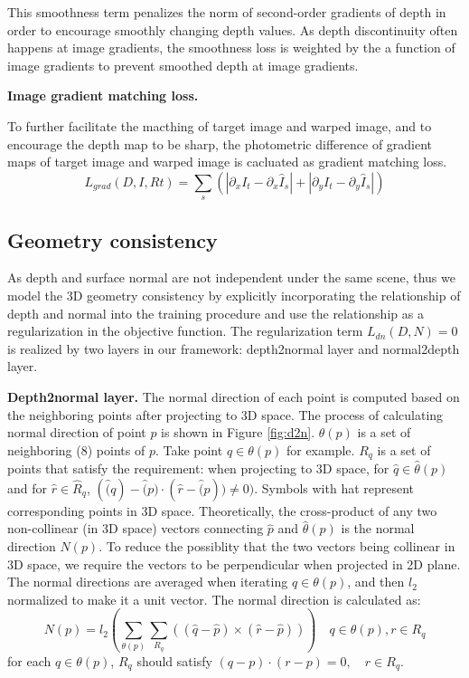 \documentclass[letterpaper]{article} %
\begin{document}
This smoothness term penalizes the norm of second-order gradients of depth in order to encourage smoothly changing depth values. As depth discontinuity often happens at image gradients, the smoothness loss is weighted by the a function of image gradients to prevent smoothed depth at image gradients. 

\textbf{Image gradient matching loss.}

To further facilitate the macthing of target image and warped image, and to encourage the depth map to be sharp, the photometric difference of gradient maps of target image and warped image is cacluated as gradient matching loss.
$$L_{grad}(D, I, Rt) = \sum_s(|\partial_xI_t - \partial_x\hat{I}_s| + |\partial_yI_t - \partial_y\hat{I}_s|)$$


\subsection{Geometry consistency}

As depth and surface normal are not independent under the same scene, 
thus we model the 3D geometry consistency by explicitly incorporating the relationship of depth and normal into the training procedure and use the relationship as a regularization in the objective function. The regularization term $L_{dn}(D,N) = 0$ is realized by two layers in our framework: depth2normal layer and normal2depth layer.

\textbf{Depth2normal layer.} The normal direction of each point is computed based on the neighboring points after projecting to 3D space. The process of calculating normal direction of point $p$ is shown in Figure \ref{fig:d2n}. $\theta(p)$ is a set of neighboring (8) points of $p$. Take point $q \in \theta(p)$ for example. $R_{q}$ is a set of points that satisfy the requirement: when projecting to 3D space, for $\hat{q} \in \hat{\theta}(p)$ and for $\hat{r} \in \hat{R}_{q}$, $(\hat(q)-\hat(p) \cdot (\hat{r} - \hat(p)) \neq 0)$. Symbols with hat represent corresponding points in 3D space. Theoretically, the cross-product of any two non-collinear (in 3D space) vectors connecting $\hat{p}$ and $\hat{\theta}(p)$ is the normal direction $N(p)$. To reduce the possiblity that the two vectors being collinear in 3D space, we require the vectors to be perpendicular when projected in 2D plane. The normal directions are averaged when iterating $q \in \theta(p)$, and then $l_2$ normalized to make it a unit vector. The normal direction is calculated as:
$$N(p) = l_2(\sum_{\theta(p)}\sum_{R_q}((\hat{q} - \hat{p}) \times (\hat{r} - \hat{p}))) \quad q \in \theta(p), r \in R_q$$
for each $q\in\theta(p)$, $R_q$ should satisfy $(q-p)\cdot(r-p) = 0, \quad r \in R_q$.
\end{document}
